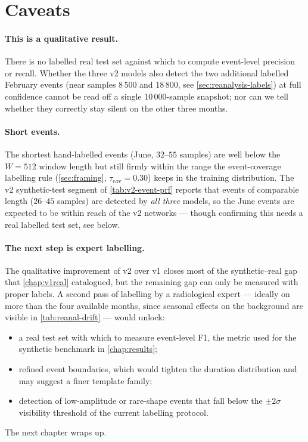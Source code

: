 \section{Caveats}
\label{sec:v2-real-caveats}

\paragraph{This is a qualitative result.} There is no labelled real
test set against which to compute event-level precision or recall.
Whether the three v2 models also detect the two additional labelled
February events (near samples $8\,500$ and $18\,800$, see
\cref{sec:reanalysis-labels}) at full confidence cannot be read off a
single $10\,000$-sample snapshot; nor can we tell whether they
correctly stay silent on the other three months.

\paragraph{Short events.} The shortest hand-labelled events (June,
$32$--$55$ samples) are well below the $W = 512$ window length but
still firmly within the range the event-coverage labelling rule
(\cref{sec:framing}, $\tau_{\text{cov}} = 0.30$) keeps in the
training distribution. The v2 synthetic-test segment of
\cref{tab:v2-event-prf} reports that events of comparable length
($26$--$45$ samples) are detected by \emph{all three} models, so the
June events are expected to be within reach of the v2 networks ---
though confirming this needs a real labelled test set, see below.

\paragraph{The next step is expert labelling.} The qualitative
improvement of v2 over v1 closes most of the synthetic--real gap that
\cref{chap:v1real} catalogued, but the remaining gap can only be
measured with proper labels. A second pass of labelling by a
radiological expert --- ideally on more than the four available
months, since seasonal effects on the background are visible in
\cref{tab:reanal-drift} --- would unlock:
\begin{itemize}[leftmargin=*, itemsep=0.2em]
    \item a real test set with which to measure event-level F1, the
    metric used for the synthetic benchmark in \cref{chap:results};
    \item refined event boundaries, which would tighten the duration
    distribution and may suggest a finer template family;
    \item detection of low-amplitude or rare-shape events that fall
    below the $\pm 2\sigma$ visibility threshold of the current
    labelling protocol.
\end{itemize}

The next chapter wraps up.
